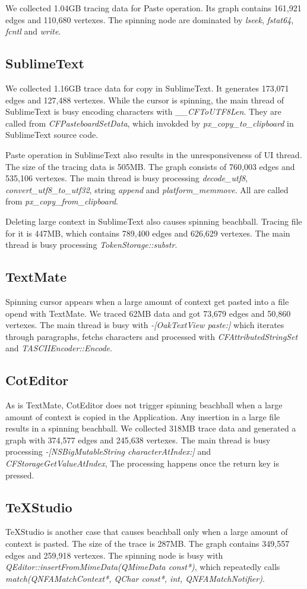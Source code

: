 We collected 1.04GB tracing data for Paste operation. Its graph contains 161,921 edges and 110,680 vertexes.
The spinning node are dominated by \textit{lseek}, \textit{fstat64}, \textit{fcntl} and \textit{write}.

\subsection{SublimeText}
We collected 1.16GB trace data for copy in SublimeText. It generates 173,071 edges and 127,488 vertexes.
While the cursor is spinning, the main thread of SublimeText is busy encoding characters with \textit{\_\_CFToUTF8Len}.
They are called from \textit{CFPasteboardSetData}, which invokded by \textit{px\_copy\_to\_clipboard} in SublimeText source code.

Paste operation in SublimeText also results in the unresponsiveness of UI thread.
The size of the tracing data is 505MB. The graph consists of 760,003 edges and 535,106 vertexes.
The main thread is busy processing \textit{decode\_utf8}, \textit{convert\_utf8\_to\_utf32}, string \textit{append} and \textit{platform\_memmove}.
All are called from \textit{px\_copy\_from\_clipboard}.

Deleting large context in SublimeText also causes spinning beachball.
Tracing file for it is 447MB, which contains 789,400 edges and 626,629 vertexes.
The main thread is busy processing \textit{TokenStorage::substr}.

\subsection{TextMate}
Spinning cursor appears when a large amount of context get pasted into a file opend with TextMate.
We traced 62MB data and got 73,679 edges and 50,860 vertexes. 
The main thread is busy with \textit{-[OakTextView paste:]} which iterates through paragraphs,
fetchs characters and processed with \textit{CFAttributedStringSet} and \textit{TASCIIEncoder::Encode}.

\subsection{CotEditor}
As is TextMate, CotEditor does not trigger spinning beachball when a large amount of context is copied in the Application.
Any insertion in a large file results in a spinning beachball.
We collected 318MB trace data and generated a graph with 374,577 edges and 245,638 vertexes.
The main thread is busy processing \textit{-[NSBigMutableString characterAtIndex:]} and \textit{CFStorageGetValueAtIndex},
The processing happens once the return key is pressed.  

\subsection{TeXStudio}
TeXStudio is another case that causes beachball only when a large amount of context is pasted.
The size of the trace is 287MB.
The graph contains 349,557 edges and 259,918 vertexes.
The spinning node is busy with \textit{QEditor::insertFromMimeData(QMimeData const*)},
which repeatedly calls \textit{match(QNFAMatchContext*, QChar const*, int, QNFAMatchNotifier)}.
